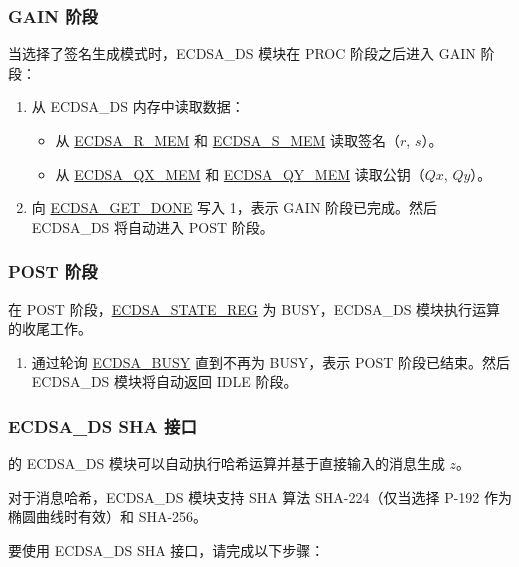 \documentclass[main\_\_CN.tex]{subfiles}
\begin{document}
\subsubsection{GAIN 阶段}

当选择了签名生成模式时，ECDSA\_DS 模块在 PROC 阶段之后进入 GAIN 阶段：

\begin{enumerate}
	\item 从 ECDSA\_DS 内存中读取数据：
	      \begin{itemize}
		      \item 从 \hyperref[tab:ecdsa-memory]{ECDSA\_R\_MEM} 和 \hyperref[tab:ecdsa-memory]{ECDSA\_S\_MEM} 读取签名（$r$, $s$）。
		      \item 从 \hyperref[tab:ecdsa-memory]{ECDSA\_QX\_MEM} 和 \hyperref[tab:ecdsa-memory]{ECDSA\_QY\_MEM} 读取公钥（$Qx$, $Qy$）。
	      \end{itemize}
	\item 向 \hyperref[fielddesc:ECDSAGETDONE]{ECDSA\_GET\_DONE} 写入 1，表示 GAIN 阶段已完成。然后 ECDSA\_DS 将自动进入 POST 阶段。
\end{enumerate}

\subsubsection{POST 阶段}

在 POST 阶段，\hyperref[regdesc:ECDSASTATEREG]{ECDSA\_STATE\_REG} 为 BUSY，ECDSA\_DS 模块执行运算的收尾工作。

\begin{enumerate}
    \item 通过轮询 \hyperref[fielddesc:ECDSABUSY]{ECDSA\_BUSY} 直到不再为 BUSY，表示 POST 阶段已结束。然后 ECDSA\_DS 模块将自动返回 IDLE 阶段。
\end{enumerate}

\subsubsection{ECDSA\_DS SHA 接口}
\label{sec:ecdsa-sha-interface}
\chipseries{} 的 ECDSA\_DS 模块可以自动执行哈希运算并基于直接输入的消息生成 $z$。

对于消息哈希，ECDSA\_DS 模块支持 SHA 算法 SHA-224（仅当选择 P-192 作为椭圆曲线时有效）和 SHA-256。

要使用 ECDSA\_DS SHA 接口，请完成以下步骤：
\end{document}
